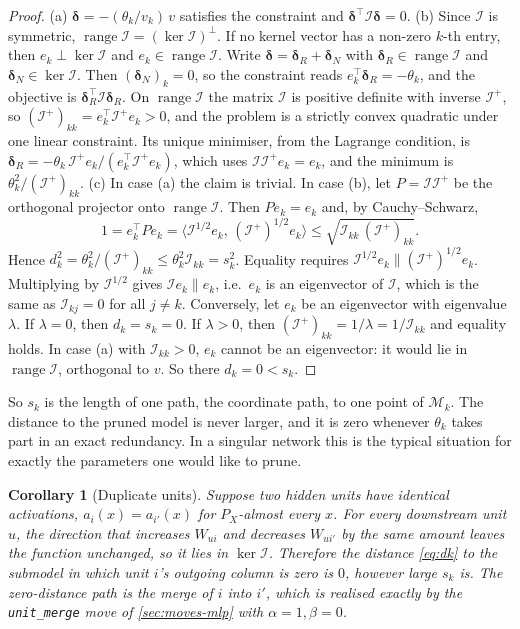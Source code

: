 \documentclass[11pt,a4paper]{article}
\newtheorem{corollary}{Corollary}
\theoremstyle{definition}
\newcommand{\bdelta}{\boldsymbol{\delta}}
\newcommand{\Fis}{\mathcal{I}}
\DeclareMathOperator{\range}{range}
\newcommand{\code}[1]{\texttt{#1}}
\begin{document}
\begin{proof}
(a) $\bdelta=-(\theta_k/v_k)\,v$ satisfies the constraint and
$\bdelta^{\top}\Fis\bdelta=0$.
(b) Since $\Fis$ is symmetric, $\range\Fis=(\ker\Fis)^{\perp}$. If no kernel vector
has a non-zero $k$-th entry, then $e_k\perp\ker\Fis$ and $e_k\in\range\Fis$. Write
$\bdelta=\bdelta_R+\bdelta_N$ with $\bdelta_R\in\range\Fis$ and
$\bdelta_N\in\ker\Fis$. Then $(\bdelta_N)_k=0$, so the constraint reads
$e_k^{\top}\bdelta_R=-\theta_k$, and the objective is
$\bdelta_R^{\top}\Fis\bdelta_R$. On $\range\Fis$ the matrix $\Fis$ is positive definite with inverse $\Fis^{+}$, so
$(\Fis^{+})_{kk}=e_k^{\top}\Fis^{+}e_k>0$, and the problem is a strictly convex quadratic
under one linear constraint. Its unique minimiser, from the Lagrange condition, is
$\bdelta_R=-\theta_k\,\Fis^{+}e_k/(e_k^{\top}\Fis^{+}e_k)$, which uses
$\Fis\Fis^{+}e_k=e_k$, and the minimum is $\theta_k^{2}/(\Fis^{+})_{kk}$.
(c) In case (a) the claim is trivial. In case (b), let $P=\Fis\Fis^{+}$ be the
orthogonal projector onto $\range\Fis$. Then $Pe_k=e_k$ and, by Cauchy--Schwarz,
\[
1=e_k^{\top}Pe_k=\big\langle\Fis^{1/2}e_k,\,(\Fis^{+})^{1/2}e_k\big\rangle
\le\sqrt{\Fis_{kk}\,(\Fis^{+})_{kk}} .
\]
Hence $d_k^{2}=\theta_k^{2}/(\Fis^{+})_{kk}\le\theta_k^{2}\Fis_{kk}=s_k^{2}$.
Equality requires $\Fis^{1/2}e_k\parallel(\Fis^{+})^{1/2}e_k$. Multiplying by
$\Fis^{1/2}$ gives $\Fis e_k\parallel e_k$, i.e.\ $e_k$ is an eigenvector of $\Fis$,
which is the same as $\Fis_{kj}=0$ for all $j\neq k$. Conversely, let $e_k$ be an
eigenvector with eigenvalue $\lambda$. If $\lambda=0$, then $d_k=s_k=0$. If
$\lambda>0$, then $(\Fis^{+})_{kk}=1/\lambda=1/\Fis_{kk}$ and equality holds. In case (a)
with $\Fis_{kk}>0$, $e_k$ cannot be an eigenvector: it would lie in $\range\Fis$,
orthogonal to $v$. So there $d_k=0<s_k$.
\end{proof}

So $s_k$ is the length of one path, the coordinate path, to one point of
$\mathcal{M}_k$. The distance to the pruned model is never larger, and it is zero
whenever $\theta_k$ takes part in an exact redundancy. In a singular network this is
the typical situation for exactly the parameters one would like to prune.

\begin{corollary}[Duplicate units]
\label{cor:duplicate}
Suppose two hidden units have identical activations, $a_i(x)=a_{i'}(x)$ for $P_X$-almost
every $x$. For every downstream unit $u$, the direction that increases $W_{u i}$ and
decreases $W_{u i'}$ by the same amount leaves the function unchanged, so it lies in
$\ker\Fis$. Therefore the distance \eqref{eq:dk} to the submodel in which unit $i$'s
outgoing column is zero is $0$, however large $s_k$ is. The zero-distance path is the
merge of $i$ into $i'$, which is realised exactly by the \code{unit\_merge} move of
\cref{sec:moves-mlp} with $\alpha=1,\beta=0$.
\end{corollary}
\end{document}
